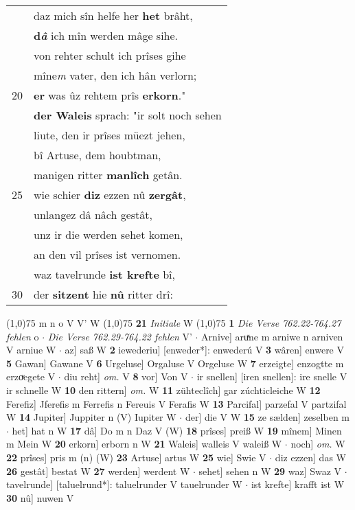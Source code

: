 \documentclass[8pt,a4paper,notitlepage]{article}
\begin{document}
\begin{table}[ht]
\begin{minipage}[t]{0.5\linewidth}
\begin{tabular}{rl}
 & daz mich sîn helfe her \textbf{het} brâht,\\ 
 & \textbf{d\textit{â}} ich mîn werden mâge sihe.\\ 
 & von rehter schult ich prîses gihe\\ 
 & mîne\textit{m} vater, den ich hân verlorn;\\ 
20 & \textbf{er} was ûz rehtem prîs \textbf{erkorn}."\\ 
 & \textbf{der Waleis} sprach: "ir solt noch sehen\\ 
 & liute, den ir prîses müezt jehen,\\ 
 & bî Artuse, dem houbtman,\\ 
 & manigen ritter \textbf{manlîch} getân.\\ 
25 & wie schier \textbf{diz} ezzen nû \textbf{zergât},\\ 
 & unlangez dâ nâch gestât,\\ 
 & unz ir die werden sehet komen,\\ 
 & an den vil prîses ist vernomen.\\ 
 & waz tavelrunde \textbf{ist krefte} bî,\\ 
30 & der \textbf{sitzent} hie \textbf{nû} ritter drî:\\ 
\end{tabular}
\scriptsize
\line(1,0){75} \newline
m n o V V' W \newline
\line(1,0){75} \newline
\textbf{21} \textit{Initiale} W  \newline
\line(1,0){75} \newline
\textbf{1} \textit{Die Verse 762.22-764.27 fehlen} o   $\cdot$ \textit{Die Verse 762.29-764.22 fehlen} V'   $\cdot$ Arnive] aruͯne m arniwe n arniven V arniue W  $\cdot$ az] saß W \textbf{2} iewederiu] [enweder*]: enwederú V \textbf{3} wâren] enwere V \textbf{5} Gawan] Gawane V \textbf{6} Urgeluse] Orgaluse V Orgeluse W \textbf{7} erzeigte] enzogtte m erzoͮegete V  $\cdot$ diu reht] \textit{om.} V \textbf{8} vor] Von V  $\cdot$ ir snellen] [iren snellen]: ire snelle V ir schnelle W \textbf{10} den rittern] \textit{om.} W \textbf{11} zühteclîch] gar zúchticleiche W \textbf{12} Ferefiz] Jferefis m Ferrefis n Fereuis V Ferafis W \textbf{13} Parcifal] parzefal V partzifal W \textbf{14} Jupiter] Juppiter n (V) Iupiter W  $\cdot$ der] die V W \textbf{15} ze sælden] zeselben m  $\cdot$ het] hat n W \textbf{17} dâ] Do m n Daz V (W) \textbf{18} prîses] preiß W \textbf{19} mînem] Minen m Mein W \textbf{20} erkorn] erborn n W \textbf{21} Waleis] walleis V waleiß W  $\cdot$ noch] \textit{om.} W \textbf{22} prîses] pris m (n) (W) \textbf{23} Artuse] artus W \textbf{25} wie] Swie V  $\cdot$ diz ezzen] das W \textbf{26} gestât] bestat W \textbf{27} werden] werdent W  $\cdot$ sehet] sehen n W \textbf{29} waz] Swaz V  $\cdot$ tavelrunde] [taluelrund*]: taluelrunder V tauelrunder W  $\cdot$ ist krefte] krafft ist W \textbf{30} nû] nuwen V \newline
\end{minipage}
\end{table}
\end{document}
